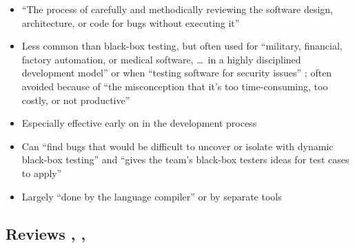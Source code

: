 \begin{itemize}
      \item ``The process of carefully and methodically reviewing the software
            design, architecture, or code for bugs without executing it''
            \citep[p.~92]{Patton2006}
      \item Less common than black-box testing, but often used for ``military,
            financial, factory automation, or medical software, \dots\ in a
            highly disciplined development model'' or when ``testing software
            for security issues'' \citep[p.~91]{Patton2006}; often
            avoided because of ``the misconception that it's too
            time-consuming, too costly, or not productive''
            \citep[p.~92]{Patton2006}
      \item Especially effective early on in the development process
            \citep[p.~92]{Patton2006}
      \item Can ``find bugs that would be difficult to uncover or isolate with
            dynamic black-box testing'' and ``gives the team's black-box
            testers ideas for test cases to apply''
            \citep[p.~92]{Patton2006}
      \item Largely ``done by the language compiler'' or by separate tools
            \citep[pp.~413-414]{vanVliet2000}
\end{itemize}

\subsection[Reviews]{Reviews \citep[pp.~92-95]{Patton2006},
      \citep[pp.~415-417]{vanVliet2000},
      \citep[pp.~482-485]{PetersAndPedrycz2000}}
\label{reviews}

